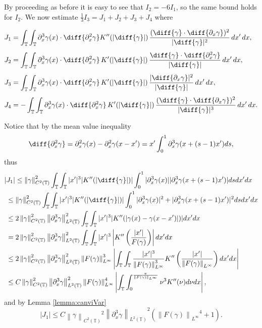 \documentclass[a4paper]{amsart}
\theoremstyle{definition}
\newcommand{\T}{\ensuremath{\mathbb{T}}}
\newcommand{\Np}[2][\infty]{\ensuremath{\left\|#2\right\|_{L^#1}}}
\newcommand{\Lp}[2][2]{\ensuremath{\left\|#2\right\|_{L^#1(\T)}}}
\newcommand{\Ck}[2][2]{\ensuremath{\left\|#2\right\|_{C^#1(\T)}}}
\newcommand{\intTT}{\ensuremath{\int_\T\int_\T}}
\begin{document}
By proceeding as before it is easy to see that $I_2=-6I_1$, so the same bound holds for $I_2$. We now estimate $\frac{1}{3}I_3=J_1+J_2+J_3+J_4$ where 

{\allowdisplaybreaks
\begin{align*}
    J_1 &= \intTT \partial_x^3\gamma(x) \cdot \diff{\partial_x^2\gamma} 
            K''(|\diff{\gamma}|) \, \frac{(\diff{\gamma} \cdot \diff{\partial_x\gamma})^2}{|\diff{\gamma}|^2} \, dx' \, dx,\\[4pt]
    J_2 &= \intTT \partial_x^3\gamma(x) \cdot \diff{\partial_x^2\gamma} \,
            K'(|\diff{\gamma}|) \, \frac{\diff{\gamma} \cdot \diff{\partial_x^2\gamma}}{|\diff{\gamma}|} \, dx' \, dx,\\[4pt]
    J_3 &= \intTT \partial_x^3\gamma(x) \cdot \diff{\partial_x^2\gamma}  \,
            K'(|\diff{\gamma}|) \, \frac{|\diff{\partial_x\gamma}|^2}{|\diff{\gamma}|} \, dx' \, dx,\\[4pt]
    J_4 &= -\intTT \partial_x^3\gamma(x) \cdot \diff{\partial_x^2\gamma} \,
            K'(|\diff{\gamma}|) \, \frac{(\diff{\gamma} \cdot \diff{\partial_x\gamma})^2}{|\diff{\gamma}|^3} \, dx' \, dx .
\end{align*}
}

    Notice that by the mean value inequality
    \begin{equation}\label{eq:MVTgammaH3}
        \diff{\partial_x^2\gamma}=\partial_ x^2\gamma(x)-\partial_x^2\gamma(x-x')=x'\int_0^1\partial_x^3 \gamma(x+(s-1)x')ds,
    \end{equation} thus
    \begin{align*}
        |&J_1|\leq \Ck{\gamma}^2\int_\T\int_\T |x'|^3 |K''(|\diff{\gamma}|)| \int_0^1 |\partial_x^3\gamma(x)||\partial_x^3 \gamma(x+(s-1)x')|ds dx'dx \\
        & \leq \Ck{\gamma}^2\int_\T\int_\T |x'|^3 |K''(|\diff{\gamma}|)| \int_0^1 |\partial_x^3\gamma(x)|^2+|\partial_x^3 \gamma(x+(s-1)x')|^2ds dx'dx \\
        &\leq 2\Ck{\gamma}^2 \Lp{\partial_x^3\gamma}^2\int_\T\int_\T |x'|^3 |K''(|\gamma(x)-\gamma(x-x')|)| dx'dx \\
        &= 2\Ck{\gamma}^2 \Lp{\partial_x^3\gamma}^2\int_\T\int_\T |x'|^3 \left|K''\left(\frac{|x'|}{F(\gamma)}\right)\right| dx'dx \\
        &\leq 2\Ck{\gamma}^2 \Lp{\partial_x^3\gamma}^2 \Np{F(\gamma)}^3\left|\int_\T\int_\T \frac{|x'|^3}{\Np{F(\gamma)}^3} K''\left(\frac{|x'|}{\Np{F(\gamma)}}\right) dx'dx \right| \\
        & \leq C \Ck{\gamma}^2 \Lp{\partial_x^3\gamma}^2 \Np{F(\gamma)}^4\left|\int_\T\int_0^{\frac{\pi}{\Np{F(\gamma)}}} \nu^3 K''(\nu) d\nu dx \right|,
    \end{align*}
    and by Lemma \ref{lemma:canviVar} 
    $$|J_1|\leq C \Ck{\gamma}^2 \Lp{\partial_x^3\gamma}^2 (\Np{F(\gamma)}^4+1).$$
    
\end{document}
